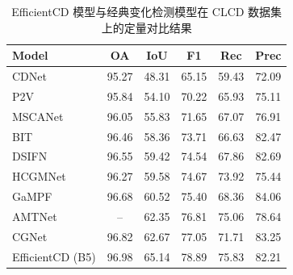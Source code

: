 \begin{table}[!htbp]
  \centering
  \caption{EfficientCD 模型与经典变化检测模型在 CLCD 数据集上的定量对比结果}
  \label{tab:efficientcd_clcd}
  \begin{tabular}{lccccc}
    \toprule
    Model              &  OA   &  IoU  &  F1   &  Rec  & Prec  \\
    \midrule
    CDNet~\cite{Alcantarilla2016StreetviewCD}              & 95.27 & 48.31 & 65.15 & 59.43 & 72.09 \\
    P2V~\cite{lin_transition_2023}                & 95.84 & 54.10 & 70.22 & 65.93 & 75.11 \\
    MSCANet~\cite{m_liu_cnn-transformer_2022}            & 96.05 & 55.83 & 71.65 & 67.07 & 76.91 \\
    BIT~\cite{chen_remote_2022}                & 96.46 & 58.36 & 73.71 & 66.63 & 82.47 \\
    DSIFN~\cite{Zhang2020ADS}              & 96.55 & 59.42 & 74.54 & 67.86 & 82.69 \\
    HCGMNet~\cite{Han2023HCGMNetAH}            & 96.27 & 59.58 & 74.67 & 73.92 & 75.44 \\
    GaMPF~\cite{Zhao2024GaMPFAF}              & 96.68 & 60.52 & 75.40 & 68.36 & 84.06 \\
    AMTNet~\cite{Liu2023AnAM}             &  --   & 62.35 & 76.81 & 75.06 & 78.64 \\
    CGNet~\cite{han_change_2023}              & 96.82 & 62.67 & 77.05 & 71.71 & 83.25 \\
    EfficientCD (B5)   & 96.98 & 65.14 & 78.89 & 75.83 & 82.21 \\
    \bottomrule
  \end{tabular}
\end{table}


